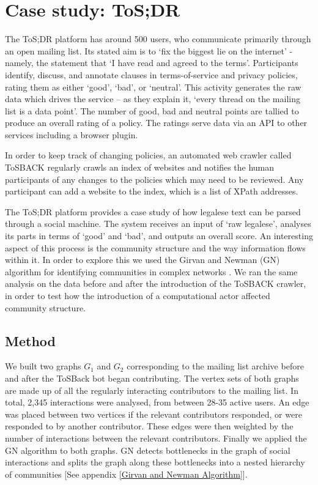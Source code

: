 \documentclass{sig-alternate-2013}
\begin{document}
\section{Case study: ToS;DR}

The ToS;DR platform has around 500 users, who communicate primarily through an open mailing list. Its stated aim is to `fix the biggest lie on the internet' - namely, the statement that `I have read and agreed to the terms'. Participants identify, discuss, and annotate clauses in terms-of-service and privacy policies, rating them as either `good', `bad', or `neutral'. This activity generates the raw data which drives the service – as they explain it, `every thread on the mailing list is a data point'. The number of good, bad and neutral points are tallied to produce an overall rating of a policy. The ratings serve data via an API to other services including a browser plugin.

In order to keep track of changing policies, an automated web crawler called ToSBACK regularly crawls an index of websites and notifies the human participants of any changes to the policies which may need to be reviewed. Any participant can add a website to the index, which is a list of XPath addresses.

The ToS;DR platform provides a case study of how legalese text can be parsed through a social machine. The system receives an input of `raw legalese', analyses its parts in terms of `good' and `bad', and outputs an overall score. An interesting aspect of this process is the community structure and the way information flows within it. In order to explore this we used the Girvan and Newman (GN) algorithm for identifying communities in complex networks \cite{gnm:comm}. We ran the same analysis on the data before and after the introduction of the ToSBACK crawler, in order to test how the introduction of a computational actor affected community structure.

\subsection{Method}

We built two graphs $G_{1}$ and $G_2$ corresponding to the mailing list archive before and after the ToSBack bot began contributing. The vertex sets of both graphs are made up of all the regularly interacting contributors to the mailing list. In total, 2,345 interactions were analysed, from between 28-35 active users. An edge was placed between two vertices if the relevant contributors responded, or were responded to by another contributor. These edges were then weighted by the number of interactions between the relevant contributors. Finally we applied the GN algorithm to both graphs. GN detects bottlenecks in the graph of social interactions and splits the graph along these bottlenecks into  a nested hierarchy of communities [See appendix \ref{Girvan and Newman Algorithm}].
\end{document}
